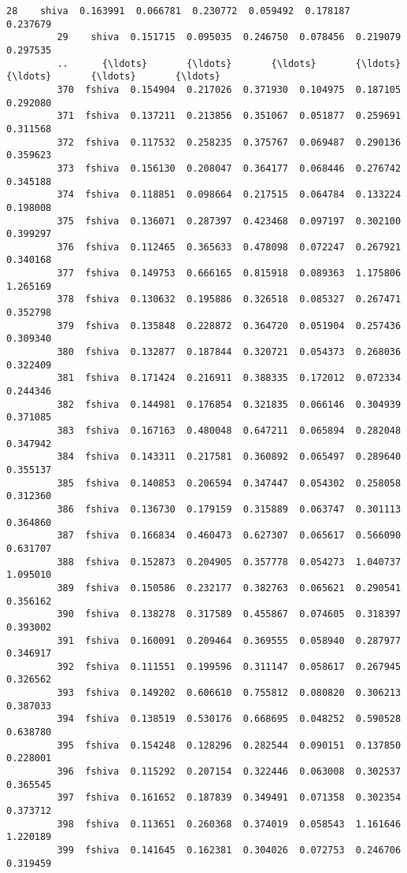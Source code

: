 \documentclass[11pt]{article}
\begin{document}
\begin{Verbatim}[commandchars=\\\{\}]
         28    shiva  0.163991  0.066781  0.230772  0.059492  0.178187  0.237679   
         29    shiva  0.151715  0.095035  0.246750  0.078456  0.219079  0.297535   
         ..      {\ldots}       {\ldots}       {\ldots}       {\ldots}       {\ldots}       {\ldots}       {\ldots}   
         370  fshiva  0.154904  0.217026  0.371930  0.104975  0.187105  0.292080   
         371  fshiva  0.137211  0.213856  0.351067  0.051877  0.259691  0.311568   
         372  fshiva  0.117532  0.258235  0.375767  0.069487  0.290136  0.359623   
         373  fshiva  0.156130  0.208047  0.364177  0.068446  0.276742  0.345188   
         374  fshiva  0.118851  0.098664  0.217515  0.064784  0.133224  0.198008   
         375  fshiva  0.136071  0.287397  0.423468  0.097197  0.302100  0.399297   
         376  fshiva  0.112465  0.365633  0.478098  0.072247  0.267921  0.340168   
         377  fshiva  0.149753  0.666165  0.815918  0.089363  1.175806  1.265169   
         378  fshiva  0.130632  0.195886  0.326518  0.085327  0.267471  0.352798   
         379  fshiva  0.135848  0.228872  0.364720  0.051904  0.257436  0.309340   
         380  fshiva  0.132877  0.187844  0.320721  0.054373  0.268036  0.322409   
         381  fshiva  0.171424  0.216911  0.388335  0.172012  0.072334  0.244346   
         382  fshiva  0.144981  0.176854  0.321835  0.066146  0.304939  0.371085   
         383  fshiva  0.167163  0.480048  0.647211  0.065894  0.282048  0.347942   
         384  fshiva  0.143311  0.217581  0.360892  0.065497  0.289640  0.355137   
         385  fshiva  0.140853  0.206594  0.347447  0.054302  0.258058  0.312360   
         386  fshiva  0.136730  0.179159  0.315889  0.063747  0.301113  0.364860   
         387  fshiva  0.166834  0.460473  0.627307  0.065617  0.566090  0.631707   
         388  fshiva  0.152873  0.204905  0.357778  0.054273  1.040737  1.095010   
         389  fshiva  0.150586  0.232177  0.382763  0.065621  0.290541  0.356162   
         390  fshiva  0.138278  0.317589  0.455867  0.074605  0.318397  0.393002   
         391  fshiva  0.160091  0.209464  0.369555  0.058940  0.287977  0.346917   
         392  fshiva  0.111551  0.199596  0.311147  0.058617  0.267945  0.326562   
         393  fshiva  0.149202  0.606610  0.755812  0.080820  0.306213  0.387033   
         394  fshiva  0.138519  0.530176  0.668695  0.048252  0.590528  0.638780   
         395  fshiva  0.154248  0.128296  0.282544  0.090151  0.137850  0.228001   
         396  fshiva  0.115292  0.207154  0.322446  0.063008  0.302537  0.365545   
         397  fshiva  0.161652  0.187839  0.349491  0.071358  0.302354  0.373712   
         398  fshiva  0.113651  0.260368  0.374019  0.058543  1.161646  1.220189   
         399  fshiva  0.141645  0.162381  0.304026  0.072753  0.246706  0.319459   
         

\end{Verbatim}
\end{document}
